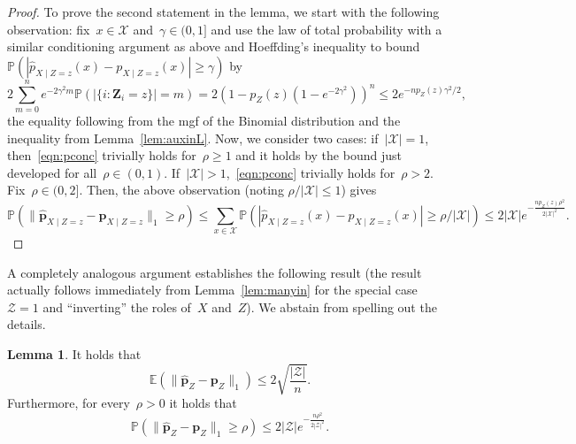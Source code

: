 \documentclass[11pt, a4paper]{article}
\theoremstyle{definition}
\newtheorem{lemma}[theorem]{Lemma}
\begin{document}
\begin{proof}
To prove the second statement in the lemma, we start with the following observation: fix~$x \in \mathcal{X}$ and~$\gamma \in (0, 1]$ and use the law of total probability with a similar conditioning argument as above  and Hoeffding's inequality to bound~$\mathbb{P}( | \hat{p}_{X \mid  Z = z}(x) - p_{X \mid  Z = z}(x)| \geq \gamma  )$ by 
%
\begin{equation*}
2\sum_{m = 0}^n e^{-2\gamma^2m} \mathbb{P}(|\{i: \bm{Z}_i = z\}| = m) = 2\left(1-p_{Z}(z)(1-e^{-2\gamma^2})\right)^n \leq 2  e^{-np_Z(z)\gamma^2/2},
\end{equation*}
the equality following from the mgf of the Binomial distribution and the inequality from Lemma~\ref{lem:auxinL}. Now, we consider two cases: if~$|\mathcal{X}| = 1$, then~\eqref{eqn:pconc} trivially holds for~$\rho \geq 1$ and it holds by the bound just developed for all~$\rho \in (0, 1)$. If~$|\mathcal{X}| > 1$,~\eqref{eqn:pconc} trivially holds for~$\rho > 2$. Fix~$\rho \in (0, 2]$. Then, the above observation (noting $\rho / |\mathcal{X}| \leq 1$) gives $$\mathbb{P}\left( \|\hat{\bm{p}}_{X\mid Z = z} - \bm{p}_{X\mid Z = z}\|_1 \geq \rho \right) \leq \sum_{x \in \mathcal{X}} \mathbb{P}( | \hat{p}_{X \mid  Z = z}(x) - p_{X \mid  Z = z}(x)| \geq \rho / |\mathcal{X}|) \leq 2 |\mathcal{X}| e^{-\frac{np_Z(z)\rho^2}{2|\mathcal{X}|^2}}.$$ 
\end{proof}
%
A completely analogous argument establishes the following result (the result actually follows immediately from Lemma~\ref{lem:manyin} for the special case~$\mathcal{Z} = 1$ and ``inverting'' the roles of~$X$ and~$Z$). We abstain from spelling out the details.
%
\begin{lemma}\label{lem:inez}
It holds that
%
\begin{equation}\label{lem:inez1}
\mathbb{E}\left( \|\hat{\bm{p}}_{Z} - \bm{p}_{Z}\|_1\right) \leq 2 \sqrt{\frac{|\mathcal{Z}|}{n}}.
\end{equation}
%
Furthermore, for every~$\rho > 0$ it holds that
%
\begin{equation}\label{lem:inez2}
\mathbb{P}\left( \|\hat{\bm{p}}_{Z} - \bm{p}_{Z}\|_1 \geq \rho \right)  \leq  2 |\mathcal{Z}| e^{-\frac{n\rho^2}{2 |\mathcal{Z}|^2}}.
\end{equation}
%
\end{lemma}
\end{document}
